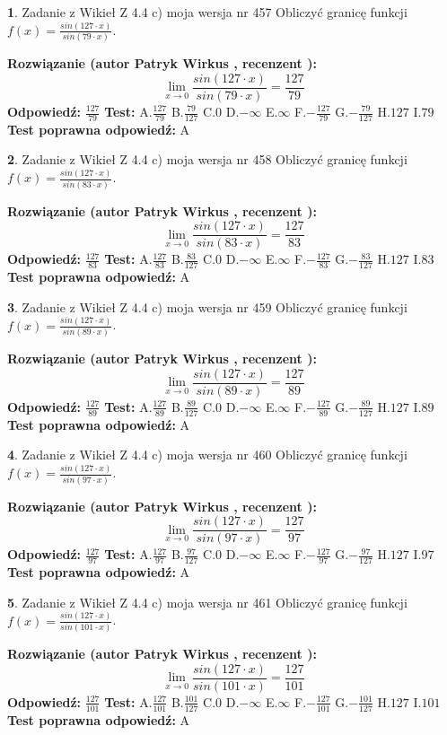 \documentclass[12pt, a4paper]{article}
\theoremstyle{definition} %
\newtheorem{zad}{}
\newcommand{\zadStart}[1]{\begin{zad}#1\newline}
\newcommand{\zadStop}{\end{zad}}
\newcommand{\rozwStart}[2]{\noindent \textbf{Rozwiązanie (autor #1 , recenzent #2): }\newline}
\newcommand{\rozwStop}{\newline}
\newcommand{\odpStart}{\noindent \textbf{Odpowiedź:}\newline}
\newcommand{\odpStop}{\newline}
\newcommand{\testStart}{\noindent \textbf{Test:}\newline}
\newcommand{\testStop}{\newline}
\newcommand{\kluczStart}{\noindent \textbf{Test poprawna odpowiedź:}\newline}
\newcommand{\kluczStop}{\newline}
\begin{document}
\zadStart{Zadanie z Wikieł Z 4.4 c) moja wersja nr 457}
Obliczyć granicę funkcji $f(x)=\frac{sin(127\cdot x)}{sin(79\cdot x)}$.
\zadStop
\rozwStart{Patryk Wirkus}{}
$$\lim\limits_{x\to 0}\frac{sin(127\cdot x)}{sin(79\cdot x)}=
\frac{127}{79}$$
\rozwStop
\odpStart
$\frac{127}{79}$
\odpStop
\testStart
A.$\frac{127}{79}$
B.$\frac{79}{127}$
C.$0$
D.$-\infty$
E.$\infty$
F.$-\frac{127}{79}$
G.$-\frac{79}{127}$
H.$127$
I.$79$
\testStop
\kluczStart
A
\kluczStop



\zadStart{Zadanie z Wikieł Z 4.4 c) moja wersja nr 458}
Obliczyć granicę funkcji $f(x)=\frac{sin(127\cdot x)}{sin(83\cdot x)}$.
\zadStop
\rozwStart{Patryk Wirkus}{}
$$\lim\limits_{x\to 0}\frac{sin(127\cdot x)}{sin(83\cdot x)}=
\frac{127}{83}$$
\rozwStop
\odpStart
$\frac{127}{83}$
\odpStop
\testStart
A.$\frac{127}{83}$
B.$\frac{83}{127}$
C.$0$
D.$-\infty$
E.$\infty$
F.$-\frac{127}{83}$
G.$-\frac{83}{127}$
H.$127$
I.$83$
\testStop
\kluczStart
A
\kluczStop



\zadStart{Zadanie z Wikieł Z 4.4 c) moja wersja nr 459}
Obliczyć granicę funkcji $f(x)=\frac{sin(127\cdot x)}{sin(89\cdot x)}$.
\zadStop
\rozwStart{Patryk Wirkus}{}
$$\lim\limits_{x\to 0}\frac{sin(127\cdot x)}{sin(89\cdot x)}=
\frac{127}{89}$$
\rozwStop
\odpStart
$\frac{127}{89}$
\odpStop
\testStart
A.$\frac{127}{89}$
B.$\frac{89}{127}$
C.$0$
D.$-\infty$
E.$\infty$
F.$-\frac{127}{89}$
G.$-\frac{89}{127}$
H.$127$
I.$89$
\testStop
\kluczStart
A
\kluczStop



\zadStart{Zadanie z Wikieł Z 4.4 c) moja wersja nr 460}
Obliczyć granicę funkcji $f(x)=\frac{sin(127\cdot x)}{sin(97\cdot x)}$.
\zadStop
\rozwStart{Patryk Wirkus}{}
$$\lim\limits_{x\to 0}\frac{sin(127\cdot x)}{sin(97\cdot x)}=
\frac{127}{97}$$
\rozwStop
\odpStart
$\frac{127}{97}$
\odpStop
\testStart
A.$\frac{127}{97}$
B.$\frac{97}{127}$
C.$0$
D.$-\infty$
E.$\infty$
F.$-\frac{127}{97}$
G.$-\frac{97}{127}$
H.$127$
I.$97$
\testStop
\kluczStart
A
\kluczStop



\zadStart{Zadanie z Wikieł Z 4.4 c) moja wersja nr 461}
Obliczyć granicę funkcji $f(x)=\frac{sin(127\cdot x)}{sin(101\cdot x)}$.
\zadStop
\rozwStart{Patryk Wirkus}{}
$$\lim\limits_{x\to 0}\frac{sin(127\cdot x)}{sin(101\cdot x)}=
\frac{127}{101}$$
\rozwStop
\odpStart
$\frac{127}{101}$
\odpStop
\testStart
A.$\frac{127}{101}$
B.$\frac{101}{127}$
C.$0$
D.$-\infty$
E.$\infty$
F.$-\frac{127}{101}$
G.$-\frac{101}{127}$
H.$127$
I.$101$
\testStop
\kluczStart
A
\kluczStop
\end{document}
